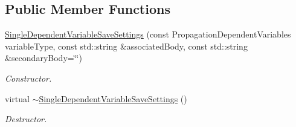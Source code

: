 \subsection*{Public Member Functions}
\begin{DoxyCompactItemize}
\item 
\hyperlink{classtudat_1_1propagators_1_1SingleDependentVariableSaveSettings_aa6650f91fe97783597a849d06f84b47b}{Single\+Dependent\+Variable\+Save\+Settings} (const Propagation\+Dependent\+Variables variable\+Type, const std\+::string \&associated\+Body, const std\+::string \&secondary\+Body=\char`\"{}\char`\"{})
\begin{DoxyCompactList}\small\item\em Constructor. \end{DoxyCompactList}\item 
virtual \hyperlink{classtudat_1_1propagators_1_1SingleDependentVariableSaveSettings_a95c16db6f51b1c0c8c599bf33e0300f6}{$\sim$\+Single\+Dependent\+Variable\+Save\+Settings} ()\hypertarget{classtudat_1_1propagators_1_1SingleDependentVariableSaveSettings_a95c16db6f51b1c0c8c599bf33e0300f6}{}\label{classtudat_1_1propagators_1_1SingleDependentVariableSaveSettings_a95c16db6f51b1c0c8c599bf33e0300f6}

\begin{DoxyCompactList}\small\item\em Destructor. \end{DoxyCompactList}\end{DoxyCompactItemize}
